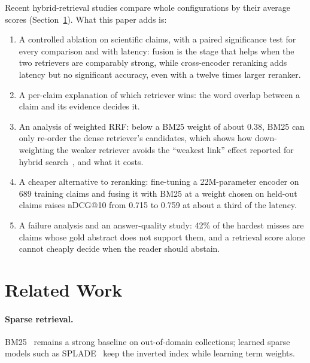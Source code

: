 \documentclass[runningheads]{llncs}
\begin{document}
\noindent Recent hybrid-retrieval studies compare whole configurations by their
average scores (Section~\ref{sec:related}). What this paper adds is:
\begin{enumerate}\itemsep2pt
  \item A controlled ablation on scientific claims, with a paired significance
        test for every comparison and with latency: fusion is the stage that helps
        when the two retrievers are comparably strong, while cross-encoder
        reranking adds latency but no significant accuracy, even with a twelve
        times larger reranker.
  \item A per-claim explanation of which retriever wins: the word overlap between
        a claim and its evidence decides it.
  \item An analysis of weighted RRF: below a BM25 weight of about 0.38, BM25 can
        only re-order the dense retriever's candidates, which shows how
        down-weighting the weaker retriever avoids the ``weakest link'' effect
        reported for hybrid search~\cite{wang2026blend}, and what it costs.
  \item A cheaper alternative to reranking: fine-tuning a 22M-parameter encoder on
        689 training claims and fusing it with BM25 at a weight chosen on held-out
        claims raises nDCG@10 from 0.715 to 0.759 at about a third of the latency.
  \item A failure analysis and an answer-quality study: 42\% of the hardest misses
        are claims whose gold abstract does not support them, and a retrieval score
        alone cannot cheaply decide when the reader should abstain.
\end{enumerate}

\section{Related Work}
\label{sec:related}

\paragraph{Sparse retrieval.} BM25~\cite{robertson2009bm25} remains a strong
baseline on out-of-domain collections; learned sparse models such as
SPLADE~\cite{formal2021splade} keep the inverted index while learning term weights.
\end{document}
